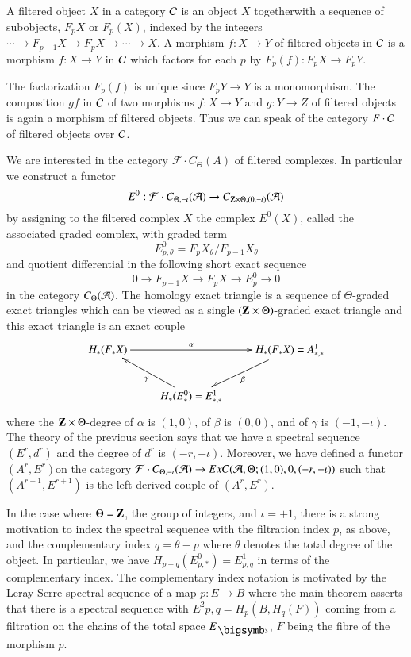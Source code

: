 \begin{definition}\label{chap1-defi5.1}
A filtered object $X$ in a category $\mathcal{C}$ is an object $X$
together\pageoriginale with a sequence of subobjects, $F_{p}X$ or
$F_{p}(X)$, indexed by the integers $\cdots\to F_{p-1}X\to F_{p}X\to
\cdots\to X$. A morphism $f:X\to Y$ of filtered objects in $\mathcal{C}$ is a
morphism $f:X\to Y$ in $\mathcal{C}$ which factors for each $p$ by
$F_{p}(f):F_{p}X\to F_{p}Y$.
\end{definition}

The factorization $F_{p}(f)$ is unique since $F_{p}Y\to Y$ is a
monomorphism. The composition $gf$ in $\mathcal{C}$ of two morphisms $f:X\to Y$
and $g:Y\to Z$ of filtered objects is again a morphism of filtered
objects. Thus we can speak of the category $F\cdot\mathcal{C}$ of filtered
objects over $\mathcal{C}$. 

\begin{remark}\label{chap1-rem5.2}
We are interested in the category $\mathcal{F}\cdot C_{\Theta}(A)$ of filtered
complexes. In particular we construct a functor
$$
E^{0}:\mathcal{F}\cdot C_{\Theta,-\iota}(\mathcal{A})\to C_{\mathbf{Z}\times
  \Theta,(0,-\iota)}(\mathcal{A}) 
$$
by assigning to the filtered complex $X$ the complex $E^{0}(X)$,
called the associated graded complex, with graded term
$$
E^{0}_{p,\theta}=F_{p}X_{\theta}/F_{p-1}X_{\theta}
$$
and quotient differential in the following short exact sequence
$$
0\to F_{p-1}X\to F_{p}X\to E^{0}_{p}\to 0
$$
in the category $C_{\Theta}(\mathcal{A})$. The homology exact triangle is a
sequence of $\Theta$-graded exact triangles which can be viewed as a
single $(\mathbf{Z}\times\Theta)$-graded exact triangle and this exact
triangle is an exact couple 
\[
\xymatrix{
H_{\ast}(F_{\ast}X)\ar[rr]^-{\alpha} & &
H_{\ast}(F_{\ast}X)=A^{1}_{\ast,\ast}\ar[dl]^{\beta}\\
 & H_{\ast}(E^{0}_{\ast})=E^{1}_{\ast,\ast}\ar[ul]^{\gamma}
}
\]
where the $\mathbf{Z}\times \Theta$-degree of $\alpha$ is $(1,0)$, of
$\beta$ is $(0,0)$, and of $\gamma$ is $(-1,-\iota)$. The theory of
the previous section says that we have a spectral sequence
$(E^{r},d^{r})$ and the degree of $d^{r}$ is $(-r,-\iota)$. Moreover,
we have defined a functor $(A^{r},E^{r})$\pageoriginale on the
category $\mathcal{F} \cdot  
C_{\Theta,-\iota}(\A)\to ExC(\A,\Theta;(1,0),0,\break (-r,-\iota))$ such that
$(A^{r+1},E^{r+1})$ is the left derived couple of $(A^{r},E^{r})$.
\end{remark}


In the case where $\Theta=\mathbf{Z}$, the group of integers, and
$\iota=+1$, there is a strong motivation to index the spectral
sequence with the filtration index $p$, as above, and the
complementary index $q=\theta-p$ where $\theta$ denotes the total
degree of the object. In particular, we have
$H_{p+q}(E^{0}_{p,\ast})=E^{1}_{p,q}$ in terms of the complementary
index. The complementary index notation is motivated by the
Leray-Serre spectral sequence of a map $p:E\to B$ where the main
theorem asserts that there is a spectral sequence with
$E^{2}{p,q}=H_{p}(B,H_{q}(F))$ coming from a filtration on the chains
of the total space $E_{\bigdot}$, $F$ being the fibre of the morphism
$p$.

